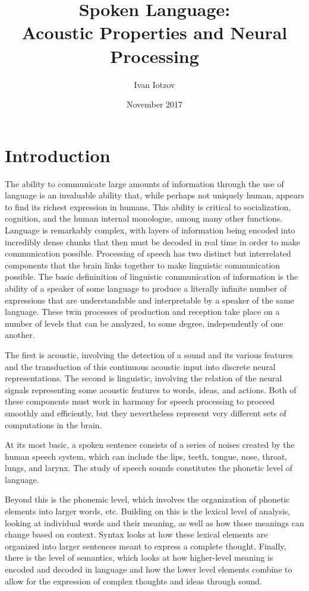 \documentclass[titlepage]{article}
\title{Spoken Language:\\ Acoustic Properties and Neural Processing}
\author{Ivan Iotzov}
\date{November 2017}
\begin{document}

\maketitle


\section{Introduction} \label{intro}

  The ability to communicate large amounts of information through the use of
  language is an invaluable ability that, while perhaps not uniquely human,
  appears to find its richest expression in humans. This ability is critical to
  socialization, cognition, and the human internal monologue, among many other functions.
  Language is remarkably complex, with layers of information being encoded
  into incredibly dense chunks that then must be decoded in real time in order to make
  communication possible. Processing of speech has two distinct but interrelated
  components that the brain links together to make linguistic communication possible.
  The basic defininition of linguistic communication of information is the ability
  of a speaker of some language to produce a literally infinite number of expressions
  that are understandable and interpretable by a speaker of the same language.
  These twin processes of production and reception take place on a number of levels
  that can be analyzed, to some degree, independently of one another.


  The first is acoustic, involving the detection of a sound and its various features
  and the transduction of this continuous acoustic input into discrete neural representations.
  The second is linguistic, involving the relation of the neural signals representing
  some acoustic features to words, ideas, and actions.
  Both of these components must work in harmony for speech processing to proceed
  smoothly and efficiently, but they nevertheless represent very different sets
  of computations in the brain.


  At its most basic, a spoken sentence consists of a series of noises
  created by the human speech system, which can include the lips, teeth, tongue,
  nose, throat, lungs, and larynx. The study of speech sounds constitutes the
  phonetic level of language.


  Beyond this is the phonemic level, which involves the organization
  of phonetic elements into larger words, etc. Building on this is the
  lexical level of analysis, looking at individual words and their meaning, as
  well as how those meanings can change based on context. Syntax looks at how these lexical
  elements are organized into larger sentences meant to express a complete thought. Finally,
  there is the level of semantics, which looks at how higher-level meaning is encoded
  and decoded in language and how the lower level elements combine to
  allow for the expression of complex thoughts and ideas through sound.
\end{document}

